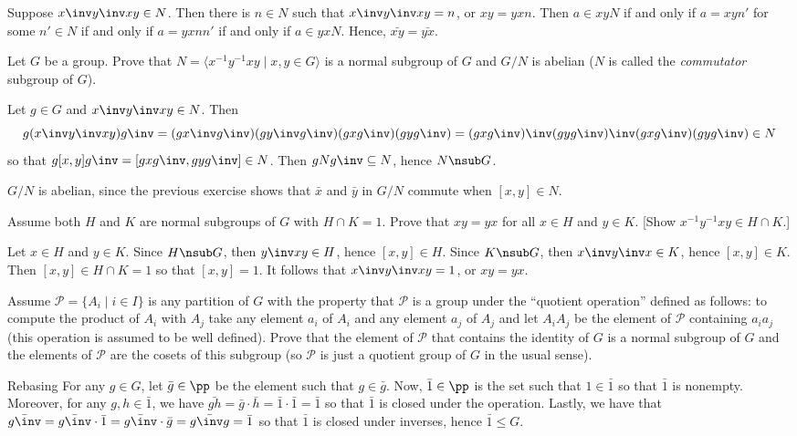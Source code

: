 \begin{problems}
\begin{sol}
        \noindent \leftimp Suppose $x\inv y\inv xy\in N$. Then there is $n \in N$ such that $x\inv y\inv xy = n$, or $xy = yxn$. Then $a \in xyN$ if and only if $a = xyn'$ for some $n' \in N$ if and only if $a = yxnn'$ if and only if $a \in yxN$. Hence, $\bar{xy} = \bar{yx}$.
    \end{sol}
    \item Let $G$ be a group. Prove that $N = \langle x^{-1}y^{-1}xy \mid x,y \in G \rangle$ is a normal subgroup of $G$ and $G/N$ is abelian ($N$ is called the \textit{commutator} subgroup of $G$).
    \begin{sol}
        Let $g \in G$ and $x\inv y\inv xy \in N$. Then 
        \[g(x\inv y\inv xy)g\inv = (gx\inv g\inv)(g y\inv g\inv)(gxg\inv)(gyg\inv) = (gxg\inv)\inv(gyg\inv)\inv(gxg\inv)(gyg\inv) \in N\]
        so that $g[x, y]g\inv = [gxg\inv, gyg\inv] \in N$. Then $gNg\inv \subseteq N$, hence $N \nsub G$.
        
        $G/N$ is abelian, since the previous exercise shows that $\bar x$ and $\bar y$ in $G/N$ commute when $[x, y] \in N$.
    \end{sol}
    \item Assume both $H$ and $K$ are normal subgroups of $G$ with $H \cap K = 1$. Prove that $xy = yx$ for all $x \in H$ and $y \in K$. [Show $x^{-1}y^{-1}xy \in H \cap K$.]
    \begin{sol}
        Let $x \in H$ and $y \in K$. Since $H \nsub G$, then $y\inv xy \in H$, hence $[x, y] \in H$. Since $K \nsub G$, then $x\inv y\inv x\in K$, hence $[x, y] \in K$. Then $[x, y] \in H \cap K = 1$ so that $[x, y] = 1$. It follows that $x\inv y\inv xy = 1$, or $xy = yx$.
    \end{sol}
    \item Assume $\mathcal{P} = \{A_i \mid i \in I\}$ is any partition of $G$ with the property that $\mathcal{P}$ is a group under the ``quotient operation'' defined as follows: to compute the product of $A_i$ with $A_j$ take any element $a_i$ of $A_i$ and any element $a_j$ of $A_j$ and let $A_iA_j$ be the element of $\mathcal{P}$ containing $a_ia_j$ (this operation is assumed to be well defined). Prove that the element of $\mathcal{P}$ that contains the identity of $G$ is a normal subgroup of $G$ and the elements of $\mathcal{P}$ are the cosets of this subgroup (so $\mathcal{P}$ is just a quotient group of $G$ in the usual sense).
    \begin{sol}Rebasing
        For any $g \in G$, let $\bar g \in \pp$ be the element such that $g \in \bar g$. Now, $\bar 1 \in \pp$ is the set such that $1 \in \bar 1$ so that $\bar 1$ is nonempty. Moreover, for any $g, h \in \bar 1$, we have $\bar{gh} = \bar g \cdot \bar h = \bar 1 \cdot \bar 1 = \bar 1$ so that $\bar 1$ is closed under the operation. Lastly, we have that $\bar{g\inv} = \bar{g\inv} \cdot \bar 1 = \bar{g\inv} \cdot \bar g = \bar{g\inv g} = \bar 1$ so that $\bar 1$ is closed under inverses, hence $\bar 1 \leq G$.
        

\end{sol}
\end{problems}
